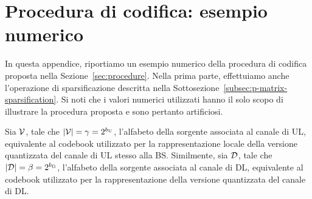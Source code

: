 \chapter{Procedura di codifica: esempio numerico}

\thispagestyle{empty}

In questa appendice, riportiamo un esempio numerico della procedura di codifica
proposta nella Sezione~\ref{sec:procedure}. Nella prima parte, effettuiamo
anche l'operazione di sparsificazione descritta nella
Sottosezione~\ref{subsec:p-matrix-sparsification}.
Si noti che i valori numerici utilizzati hanno il solo scopo di illustrare la
procedura proposta e sono pertanto artificiosi.

\medskip

Sia \(\mathcal{V}\), tale che \(\abs{\set{V}} = \gamma = 2^{b_\mathrm{U}}\),
l'alfabeto della sorgente associata al canale di UL, equivalente al codebook
utilizzato per la rappresentazione locale della versione quantizzata del canale
di UL stesso alla BS. Similmente, sia \(\mathcal{D}\), tale che \(\abs{\set{D}} =
\beta = 2^{b_\mathrm{B}}\), l'alfabeto della sorgente associata al canale di
DL, equivalente al codebook utilizzato per la rappresentazione della versione
quantizzata del canale di DL.

